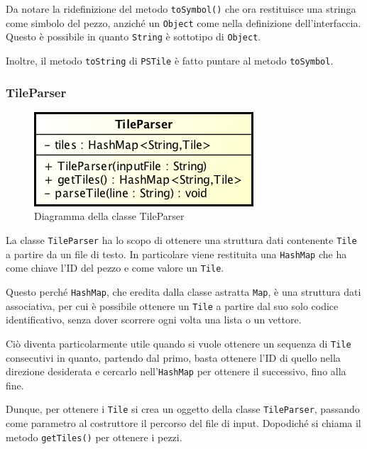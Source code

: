 \documentclass[a4paper, 12pt]{article}
\begin{document}
        Da notare la ridefinizione del metodo \verb|toSymbol()| che ora restituisce una stringa come simbolo del pezzo, anziché un \verb|Object| come nella definizione dell'interfaccia. Questo è possibile in quanto \verb|String| è sottotipo di \verb|Object|.

        Inoltre, il metodo \verb|toString| di \verb|PSTile| è fatto puntare al metodo \verb|toSymbol|.

      \subsubsection{TileParser}

        \begin{figure}[H]

          \centering
          \includegraphics[scale=0.7]{uml/tileparser.png}
          \caption{Diagramma della classe TileParser}
          \label{uml:tileparser}

        \end{figure}

        La classe \verb|TileParser| ha lo scopo di ottenere una struttura dati contenente \verb|Tile| a partire da un file di testo. In particolare viene restituita una \verb|HashMap| che ha come chiave l'ID del pezzo e come valore un \verb|Tile|. 

        Questo perché \verb|HashMap|, che eredita dalla classe astratta \verb|Map|, è una struttura dati associativa, per cui è possibile ottenere un \verb|Tile| a partire dal suo solo codice identificativo, senza dover scorrere ogni volta una lista o un vettore. 

        Ciò diventa particolarmente utile quando si vuole ottenere un sequenza di \verb|Tile| consecutivi in quanto, partendo dal primo, basta ottenere l'ID di quello nella direzione desiderata e cercarlo nell'\verb|HashMap| per ottenere il successivo, fino alla fine.

        Dunque, per ottenere i \verb|Tile| si crea un oggetto della classe \verb|TileParser|, passando come parametro al costruttore il percorso del file di input. Dopodiché si chiama il metodo \verb|getTiles()| per ottenere i pezzi. 
\end{document}
